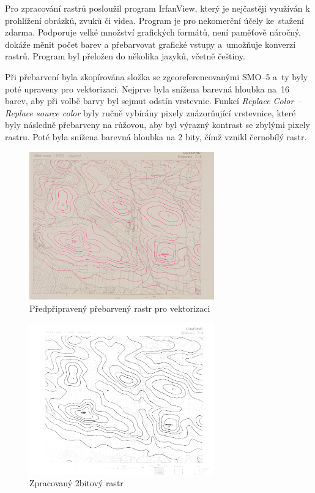 \documentclass[thesis=M,czech]{FITthesis}[2012/06/26]
\begin{document}
Pro zpracování rastrů posloužil program IrfanView, který je nejčastěji využíván k prohlížení obrázků, zvuků či videa. Program je pro nekomerční účely ke~stažení zdarma. Podporuje velké množství grafických formátů, není paměťově náročný, dokáže měnit počet barev a přebarvovat grafické vstupy a~umožňuje konverzi rastrů. Program byl přeložen do několika jazyků, včetně češtiny. 

Při přebarvení byla zkopírována složka se zgeoreferencovanými SMO–5 a~ty byly poté upraveny pro vektorizaci. Nejprve byla snížena barevná hloubka na~16 barev, aby při volbě barvy byl sejmut odstín vrstevnic. Funkcí \textit{Replace Color – Replace source color} byly ručně vybírány pixely znázorňující vrstevnice, které byly následně přebarveny na růžovou, aby byl výrazný kontrast se zbylými pixely rastru. Poté byla snížena barevná hloubka na 2 bity, čímž vznikl černobílý rastr. 

\begin{figure}[h]
	\centering
	\includegraphics[width=8cm]{pics/vrstevnice.png}
	\caption{Předpřipravený přebarvený rastr pro vektorizaci}
	\label{obrazek:vrstevniceruzova}
\end{figure}

\begin{figure}[h]
	\centering
	\includegraphics[width=8cm]{pics/vrstevnice2.png}
	\caption{Zpracovaný 2bitový rastr}
	\label{obrazek:vrstevnice2bit}
\end{figure}
\end{document}
